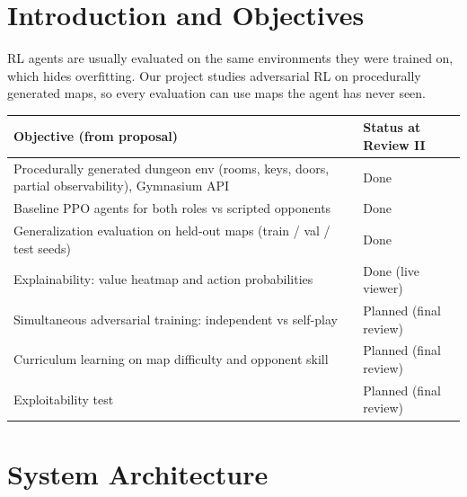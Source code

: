 \documentclass[11pt,a4paper]{article}
\begin{document}
\section{Introduction and Objectives}
RL agents are usually evaluated on the same environments they were trained on, which hides
overfitting. Our project studies adversarial RL on procedurally generated maps, so every evaluation
can use maps the agent has never seen.

\begin{center}
\begin{tabularx}{\textwidth}{Xl}
\toprule
\textbf{Objective (from proposal)} & \textbf{Status at Review II}\\
\midrule
Procedurally generated dungeon env (rooms, keys, doors, partial observability), Gymnasium API & Done\\
Baseline PPO agents for both roles vs scripted opponents & Done\\
Generalization evaluation on held-out maps (train / val / test seeds) & Done\\
Explainability: value heatmap and action probabilities & Done (live viewer)\\
Simultaneous adversarial training: independent vs self-play & Planned (final review)\\
Curriculum learning on map difficulty and opponent skill & Planned (final review)\\
Exploitability test & Planned (final review)\\
\bottomrule
\end{tabularx}
\end{center}

\section{System Architecture}
\end{document}
